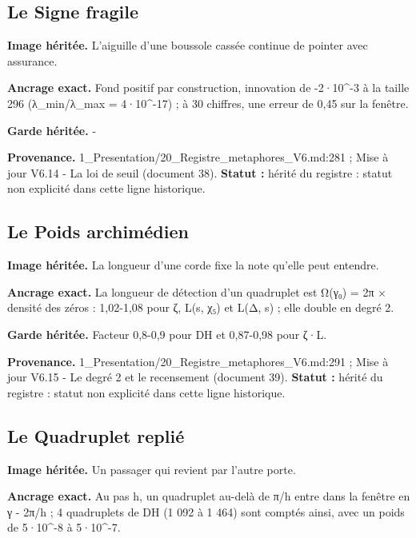 \documentclass[
  9pt,
  a4paper,
]{article}
\begin{document}
\hypertarget{le-signe-fragile}{%
\subsection{Le Signe fragile}\label{le-signe-fragile}}

\textbf{Image héritée.} L'aiguille d'une boussole cassée continue de
pointer avec assurance.

\textbf{Ancrage exact.} Fond positif par construction, innovation de
-2·10\^{}-3 à la taille 296 (λ\_min/λ\_max = 4·10\^{}-17) ; à 30
chiffres, une erreur de 0,45 sur la fenêtre.

\textbf{Garde héritée.} -

\textbf{Provenance.} 1\_Presentation/20\_Registre\_metaphores\_V6.md:281
; Mise à jour V6.14 - La loi de seuil (document 38). \textbf{Statut :}
hérité du registre : statut non explicité dans cette ligne historique.

\hypertarget{le-poids-archimuxe9dien}{%
\subsection{Le Poids archimédien}\label{le-poids-archimuxe9dien}}

\textbf{Image héritée.} La longueur d'une corde fixe la note qu'elle
peut entendre.

\textbf{Ancrage exact.} La longueur de détection d'un quadruplet est
Ω(γ₀) = 2π × densité des zéros : 1,02-1,08 pour ζ, L(s, χ₅) et L(Δ, s) ;
elle double en degré 2.

\textbf{Garde héritée.} Facteur 0,8-0,9 pour DH et 0,87-0,98 pour ζ·L.

\textbf{Provenance.} 1\_Presentation/20\_Registre\_metaphores\_V6.md:291
; Mise à jour V6.15 - Le degré 2 et le recensement (document 39).
\textbf{Statut :} hérité du registre : statut non explicité dans cette
ligne historique.

\hypertarget{le-quadruplet-repliuxe9}{%
\subsection{Le Quadruplet replié}\label{le-quadruplet-repliuxe9}}

\textbf{Image héritée.} Un passager qui revient par l'autre porte.

\textbf{Ancrage exact.} Au pas h, un quadruplet au-delà de π/h entre
dans la fenêtre en γ - 2π/h ; 4 quadruplets de DH (1 092 à 1 464) sont
comptés ainsi, avec un poids de 5·10\^{}-8 à 5·10\^{}-7.
\end{document}

